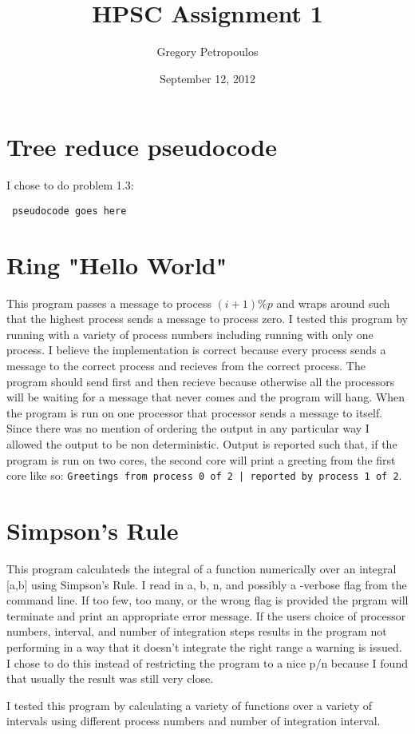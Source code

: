\documentclass[11pt,a4paper,oneside]{report}
\begin{document}
\title{HPSC Assignment 1}
\author{Gregory Petropoulos}
\date{September 12, 2012}
\maketitle

\section{Tree reduce pseudocode}

I chose to do problem 1.3:

\texttt{
pseudocode goes here
}

\section{Ring "Hello World"}

This program passes a message to process $ (i+1) \%p $ and wraps around such that the highest process sends a message to process zero.  I tested this program by running with a variety of process numbers including running with only one process.  I believe the implementation is correct because every process sends a message to the correct process and recieves from the correct process.  The program should send first and then recieve because otherwise all the processors will be waiting for a message that never comes and the program will hang.  When the program is run on one processor that processor sends a message to itself.  Since there was no mention of ordering the output in any particular way I allowed the output to be non deterministic.  Output is reported such that, if the program is run on two cores, the second core will print a greeting from the first core like so:  \texttt{Greetings from process 0 of 2 | reported by process 1 of 2}.

\section{Simpson's Rule}

This program calculateds the integral of a function numerically over an integral [a,b] using Simpson's Rule.  I read in a, b, n, and possibly a -verbose flag from the command line.  If too few, too many, or the wrong flag is provided the prgram will terminate and print an appropriate error message.  If the users choice of processor numbers, interval, and number of integration steps results in the program not performing in a way that it doesn't integrate the right range a warning is issued.  I chose to do this instead of restricting the program to a nice p/n because I found that usually the result was still very close.

I tested this program by calculating a variety of functions over a variety of intervals using different process numbers and number of integration interval.  
\end{document}
